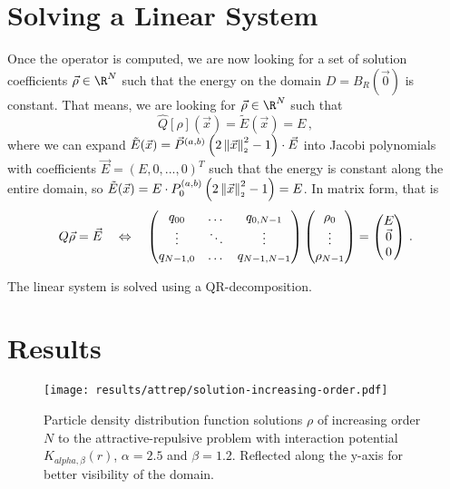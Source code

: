 \pagebreak
\section{Solving a Linear System}
Once the operator is computed, we are now looking for a set of solution coefficients $\vec{\rho} \in \R^N$ such that the energy on the domain $D = B_R(\vec{0})$ is constant.
That means, we are looking for $\vec{\rho} \in \R^N$ such that
\begin{equation}
  \hat{Q}[\rho](\vec{x}) = \tilde{E}(\vec{x}) = E\,,
\end{equation}
where we can expand $\tilde{E}(\vec{x}) = \vec{P}^{(a, b)}\left(2 \left\lVert\vec{x}\right\rVert_{\scriptscriptstyle 2}^2 - 1\right) \cdot \vec{E}$ into Jacobi polynomials with coefficients $\vec{E} = (E, 0, ..., 0)^T$ such that the energy is constant along the entire domain, so $\tilde{E}(\vec{x}) = E \cdot P_0^{(a, b)}\left(2 \left\lVert\vec{x}\right\rVert_{\scriptscriptstyle 2}^2 - 1\right) = E$.
In matrix form, that is
$$Q \vec{\rho} = \vec{E} \quad\Leftrightarrow\quad \begin{pmatrix}
    q_{00}    & \dots  & q_{0,N-1}   \\
    \vdots    & \ddots & \vdots      \\
    q_{N-1,0} & \dots  & q_{N-1,N-1} \\
  \end{pmatrix} \begin{pmatrix}
    \rho_0 \\
    \vdots \\
    \rho_{N-1}
  \end{pmatrix} = \begin{pmatrix}
    E       \\
    \vec{0} \\
    0
  \end{pmatrix}\,.$$

The linear system is solved using a QR-decomposition.

\section{Results}
\begin{figure}[H]
  \centering
  \texttt{[image: results/attrep/solution-increasing-order.pdf]}
  \caption[Solutions of increasing orders]{Particle density distribution function solutions $\rho$ of increasing order $N$ to the attractive-repulsive problem with interaction potential $K_{alpha, \beta}(r)$, $\alpha = 2.5$ and $\beta = 1.2$. Reflected along the y-axis for better visibility of the domain.}
  \label{fig:solution-increasing-order}
\end{figure}

